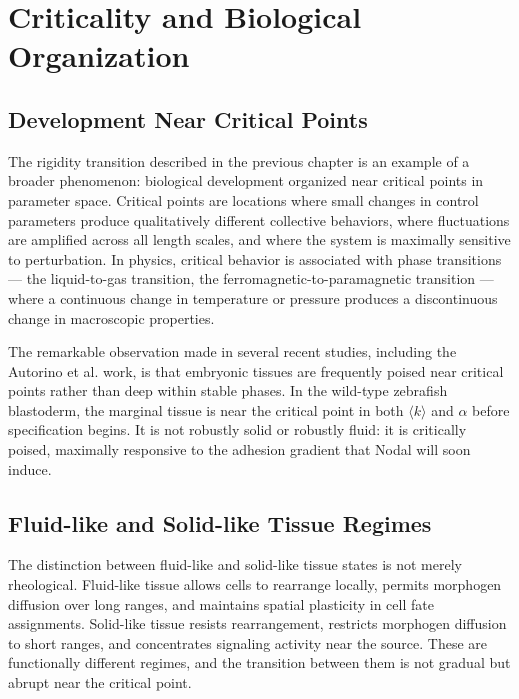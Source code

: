 \documentclass[12pt, a4paper, openany]{book}
\theoremstyle{definition}
\theoremstyle{remark}
\begin{document}

\chapter{Criticality and Biological Organization}

\section{Development Near Critical Points}

The rigidity transition described in the previous chapter is an example of a broader phenomenon: biological development organized near critical points in parameter space. Critical points are locations where small changes in control parameters produce qualitatively different collective behaviors, where fluctuations are amplified across all length scales, and where the system is maximally sensitive to perturbation. In physics, critical behavior is associated with phase transitions — the liquid-to-gas transition, the ferromagnetic-to-paramagnetic transition — where a continuous change in temperature or pressure produces a discontinuous change in macroscopic properties.

The remarkable observation made in several recent studies, including the Autorino et al. work, is that embryonic tissues are frequently poised near critical points rather than deep within stable phases. In the wild-type zebrafish blastoderm, the marginal tissue is near the critical point in both $\langle k \rangle$ and $\alpha$ before specification begins. It is not robustly solid or robustly fluid: it is critically poised, maximally responsive to the adhesion gradient that Nodal will soon induce.

\section{Fluid-like and Solid-like Tissue Regimes}

The distinction between fluid-like and solid-like tissue states is not merely rheological. Fluid-like tissue allows cells to rearrange locally, permits morphogen diffusion over long ranges, and maintains spatial plasticity in cell fate assignments. Solid-like tissue resists rearrangement, restricts morphogen diffusion to short ranges, and concentrates signaling activity near the source. These are functionally different regimes, and the transition between them is not gradual but abrupt near the critical point.
\end{document}
